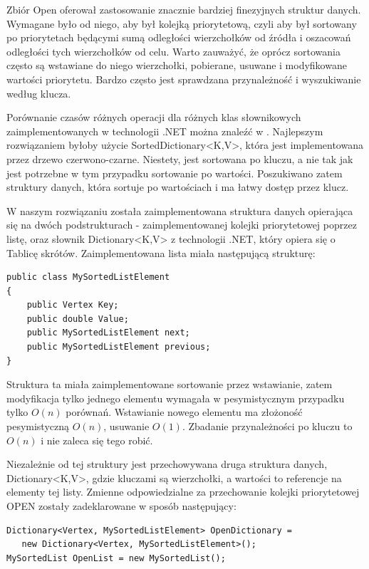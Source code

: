 \documentclass[a4paper,11pt,twoside,openright]{report}
\theoremstyle{definition}
\begin{document}
Zbiór Open oferował zastosowanie znacznie bardziej finezyjnych struktur danych.
Wymagane było od niego, aby był kolejką priorytetową, czyli aby był sortowany po
priorytetach będącymi sumą odległości wierzchołków od źródła i oszacowań odległości
tych wierzchołków od celu. Warto zauważyć, że oprócz sortowania często są wstawiane
do niego wierzchołki, pobierane, usuwane i modyfikowane wartości priorytetu.
Bardzo często jest sprawdzana przynależność i wyszukiwanie według klucza.

Porównanie czasów różnych operacji dla różnych klas słownikowych zaimplementowanych
w technologii .NET można znaleźć w \cite{C w pigulce}.
Najlepszym rozwiązaniem byłoby użycie SortedDictionary<K,V>,
która jest implementowana przez drzewo czerwono-czarne. Niestety, jest
sortowana po kluczu, a nie tak jak jest potrzebne w tym przypadku sortowanie
po wartości. Poszukiwano zatem struktury danych, która sortuje po wartościach
i ma łatwy dostęp przez klucz.

W naszym rozwiązaniu została zaimplementowana struktura danych opierająca się
na dwóch podstrukturach - zaimplementowanej kolejki priorytetowej poprzez listę,
oraz słownik Dictionary<K,V> z technologii .NET, który opiera się o Tablicę
skrótów. Zaimplementowana lista miała następującą strukturę:

\begin{verbatim}
public class MySortedListElement
{
    public Vertex Key;
    public double Value;
    public MySortedListElement next;
    public MySortedListElement previous;
}
\end{verbatim}

Struktura ta miała zaimplementowane sortowanie przez wstawianie, zatem modyfikacja
tylko jednego elementu wymagała w pesymistycznym przypadku tylko $O(n)$ porównań.
Wstawianie nowego elementu ma złożoność pesymistyczną $O(n)$, usuwanie $O(1)$.
Zbadanie przynależności po kluczu to $O(n)$ i nie zaleca się tego robić.

Niezależnie od tej struktury jest przechowywana druga struktura danych,
Dictionary<K,V>, gdzie kluczami są wierzchołki, a wartości to referencje na
elementy tej listy. Zmienne odpowiedzialne za przechowanie kolejki priorytetowej
OPEN zostały zadeklarowane w sposób następujący:

\begin{verbatim}
Dictionary<Vertex, MySortedListElement> OpenDictionary =
   new Dictionary<Vertex, MySortedListElement>();
MySortedList OpenList = new MySortedList();
\end{verbatim}
\end{document}
